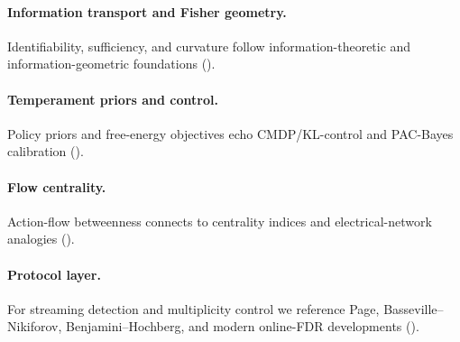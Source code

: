 \paragraph{Information transport and Fisher geometry.}
Identifiability, sufficiency, and curvature follow information-theoretic and information-geometric foundations
(\parencite{Blackwell1953,LehmannCasella1998,CoverThomas2006,AmariNagaoka2000}).

\paragraph{Temperament priors and control.}
Policy priors and free-energy objectives echo CMDP/KL-control and PAC-Bayes calibration
(\parencite{Puterman1994,Altman1999,Kappen2005,Todorov2009,McAllester1999,Catoni2007}).

\paragraph{Flow centrality.}
Action-flow betweenness connects to centrality indices and electrical-network analogies
(\parencite{Freeman1977,Katz1953,Newman2005,DoyleSnell1984}).

\paragraph{Protocol layer.}
For streaming detection and multiplicity control we reference Page, Basseville--Nikiforov, Benjamini--Hochberg,
and modern online-FDR developments
(\parencite{Page1954,BassevilleNikiforov1993,BenjaminiHochberg1995,JavanmardMontanari2018,RamdasEtAl2018}).